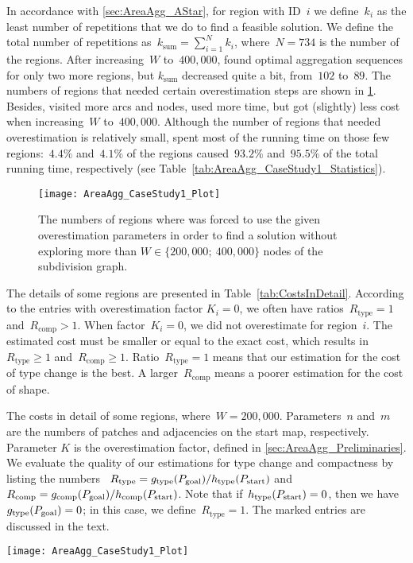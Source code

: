 In accordance with \sect\ref{sec:AreaAgg_AStar}, 
for region with ID~$i$ 
we define~$k_i$ as the least number of repetitions 
that we do to find a feasible solution. 
We define the total number of repetitions 
as~$k_\mathrm{sum}=\sum_{i=1}^N k_i$, 
where~$N=734$ is the number of the regions.
After increasing~$W$ to~$400{,}000$, 
\Astar found optimal aggregation sequences 
for only two more regions, 
but $k_\mathrm{sum}$ decreased quite a bit, 
from~$102$ to~$89$. 
The numbers of regions that needed certain
overestimation steps are shown in 
\fig\ref{fig:AreaAgg_OverStats}. 
Besides, \Astar visited more arcs and nodes, 
used more time, 
but got (slightly) less cost when increasing~$W$ to~$400{,}000$.
Although the number of regions 
that needed overestimation is relatively small, 
\Astar spent most of the running time 
on those few regions:~$4.4\%$ and~$4.1\%$ of the regions 
caused~$93.2\%$ and~$95.5\%$ of the total running time, 
respectively 
(see Table~\ref{tab:AreaAgg_CaseStudy1_Statistics}).

\begin{figure}[tb]
\centering
\texttt{[image: AreaAgg\_CaseStudy1\_Plot]}
\caption{The numbers of regions where \Astar was 
	forced to use the given overestimation parameters
	in order to find a solution 
	without exploring more than 
	$W \in \{200{,}000;~400{,}000\}$ 
	nodes of the subdivision graph.}
\label{fig:AreaAgg_OverStats}
\end{figure}

The details of some regions are presented in 
Table~\ref{tab:CostsInDetail}.
According to the entries with overestimation factor $K_i=0$, 
we often have 
ratios~$R_\mathrm{type}=1$ and~$R_\mathrm{comp}>1$.
When factor~$K_i=0$, we did not overestimate for region~$i$.
The estimated cost must be smaller or equal to the exact cost,
which results in~$R_\mathrm{type}\ge 1$ 
and~$R_\mathrm{comp}\ge 1$.
Ratio~$R_\mathrm{type} = 1$ means that our estimation for the 
cost of type change is the best.
A larger~$R_\mathrm{comp}$ means 
a poorer estimation for the cost of shape.

\begin{table*}[tb]
\caption{The costs in detail of some regions, 
	where~$W=200{,}000$.  
	Parameters~$n$ and~$m$ are the numbers of patches and 
	adjacencies on the start map, respectively.
	Parameter $K$ is the overestimation factor, 
	defined in \sect\ref{sec:AreaAgg_Preliminaries}. 
	We evaluate the quality 
	of our estimations for type change and 
	compactness by listing the numbers~
	$R_\mathrm{type}=g_\mathrm{type}(P_\mathrm{goal})
	/h_\mathrm{type}(P_\mathrm{start})$ and~
	$R_\mathrm{comp}=g_\mathrm{comp}(P_\mathrm{goal})
	/h_\mathrm{comp}(P_\mathrm{start})$. 
	Note that if~$h_\mathrm{type}(P_\mathrm{start})=0$,
    then we have~$g_\mathrm{type}(P_\mathrm{goal})=0$; 
	in this case, we define~$R_\mathrm{type}=1$.
	The marked entries are discussed in the text.
}
\label{tab:CostsInDetail}
\centering
\texttt{[image: AreaAgg\_CaseStudy1\_Plot]}
\end{table*}



